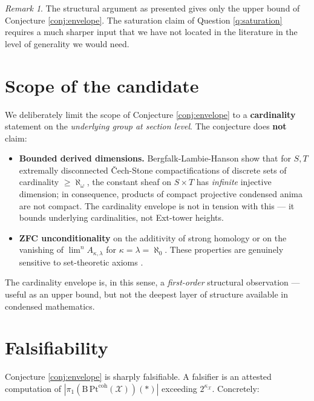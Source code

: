 \documentclass[11pt]{article}
\theoremstyle{definition}
\theoremstyle{plain}
\theoremstyle{remark}
\newtheorem*{remark}{Remark}
\newcommand{\Pt}{\mathrm{Pt}}
\newcommand{\Bcat}{\mathrm{B}}
\begin{document}
\begin{remark}
The structural argument as presented gives only the upper bound of
Conjecture \ref{conj:envelope}. The saturation claim of
Question \ref{q:saturation} requires a much sharper input that we have not
located in the literature in the level of generality we would need.
\end{remark}

\section{Scope of the candidate}\label{sec:scope}

We deliberately limit the scope of Conjecture \ref{conj:envelope} to a
\textbf{cardinality} statement on the \emph{underlying group at section
level}. The conjecture does \textbf{not} claim:

\begin{itemize}
\item \textbf{Bounded derived dimensions.} Bergfalk-Lambie-Hanson
\cite[Theorem D]{BergfalkLH2024} show that for $S, T$ extremally disconnected
\v{C}ech-Stone compactifications of discrete sets of cardinality $\ge
\aleph_\omega$, the constant sheaf on $S \times T$ has \emph{infinite}
injective dimension; in consequence, products of compact projective condensed
anima are not compact. The cardinality envelope is not in tension with this
--- it bounds underlying cardinalities, not Ext-tower heights.
\item \textbf{ZFC unconditionality} on the additivity of strong homology or
on the vanishing of $\lim^n A_{\kappa,\lambda}$ for $\kappa = \lambda =
\aleph_0$. These properties are genuinely sensitive to set-theoretic axioms
\cite[Theorem 2.10]{BergfalkLH2024}.
\end{itemize}

The cardinality envelope is, in this sense, a \emph{first-order} structural
observation --- useful as an upper bound, but not the deepest layer of
structure available in condensed mathematics.

\section{Falsifiability}\label{sec:falsifiability}

Conjecture \ref{conj:envelope} is sharply falsifiable. A falsifier is an
attested computation of
$|\pi_1(\Bcat\,\Pt^{\mathrm{coh}}(\mathcal X))(\ast)|$ exceeding
$2^{\kappa_{\mathcal X}}$. Concretely:
\end{document}
